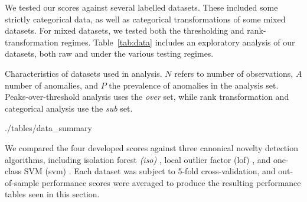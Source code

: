 We tested our scores against several labelled datasets.  These included some 
    strictly categorical data, as well as categorical transformations of some 
    mixed datasets.  For mixed datasets, we tested both the thresholding and 
    rank-transformation regimes. Table~\ref{tab:data} includes an exploratory 
    analysis of our datasets, both raw and under the various testing regimes.

\begin{table}[t]
    \centering
    \caption{Characteristics of datasets used in analysis.  $N$ refers to 
    number of observations, $A$ number of anomalies, and $P$ the prevalence of 
    anomalies in the analysis set.  Peaks-over-threshold analysis uses the 
    \emph{over} set, while rank transformation and categorical analysis use 
    the \emph{sub} set.\label{tab:data}}
    \bigskip
     {./tables/data_summary}
\end{table}

We compared the four developed scores against three canonical novelty detection 
    algorithms, including isolation forest \emph{(iso)} \cite{liu2000}, local 
    outlier factor (lof) \cite{breunig2000}, and one-class SVM (svm) 
    \cite{chang2011}.  Each dataset was subject to 5-fold cross-validation, and 
    out-of-sample performance scores were averaged to produce the resulting 
    performance tables seen in this section.

